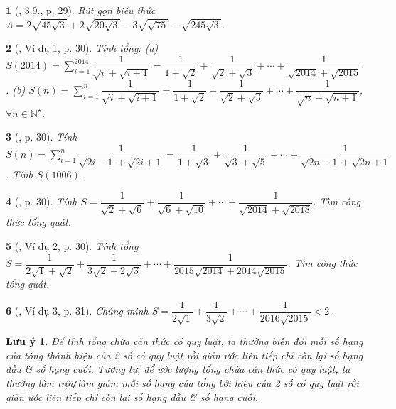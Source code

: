 \documentclass{article}
\newtheorem{baitoan}{}
\newtheorem{luuy}{Lưu ý}
\begin{document}
\begin{baitoan}[\cite{Binh_boi_duong_Toan_9_tap_1}, 3.9., p. 29]
	Rút gọn biểu thức $A = 2\sqrt{45\sqrt{3}} + 2\sqrt{20\sqrt{3}} - 3\sqrt{\sqrt{75}} - \sqrt{245\sqrt{3}}$.
\end{baitoan}

\begin{baitoan}[\cite{Binh_boi_duong_Toan_9_tap_1}, Ví dụ 1, p. 30]
	Tính tổng: (a) $S(2014) = \sum_{i=1}^{2014} \dfrac{1}{\sqrt{i} + \sqrt{i + 1}} = \dfrac{1}{1 + \sqrt{2}} + \dfrac{1}{\sqrt{2} + \sqrt{3}} + \cdots + \dfrac{1}{\sqrt{2014} + \sqrt{2015}}$. (b) $S(n) = \sum_{i=1}^n \dfrac{1}{\sqrt{i} + \sqrt{i + 1}} = \dfrac{1}{1 + \sqrt{2}} + \dfrac{1}{\sqrt{2} + \sqrt{3}} + \cdots + \dfrac{1}{\sqrt{n} + \sqrt{n + 1}}$, $\forall n\in\mathbb{N}^\star$.
\end{baitoan}

\begin{baitoan}[\cite{Binh_boi_duong_Toan_9_tap_1}, p. 30]
	Tính $S(n) = \sum_{i=1}^n \dfrac{1}{\sqrt{2i - 1} + \sqrt{2i + 1}} = \dfrac{1}{1 + \sqrt{3}} + \dfrac{1}{\sqrt{3} + \sqrt{5}} + \cdots + \dfrac{1}{\sqrt{2n - 1} + \sqrt{2n + 1}}$. Tính $S(1006)$.
\end{baitoan}

\begin{baitoan}[\cite{Binh_boi_duong_Toan_9_tap_1}, p. 30]
	Tính $S = \dfrac{1}{\sqrt{2} + \sqrt{6}} + \dfrac{1}{\sqrt{6} + \sqrt{10}} + \cdots + \dfrac{1}{\sqrt{2014} + \sqrt{2018}}$. Tìm công thức tổng quát.
\end{baitoan}

\begin{baitoan}[\cite{Binh_boi_duong_Toan_9_tap_1}, Ví dụ 2, p. 30]
	Tính tổng $S = \dfrac{1}{2\sqrt{1} + \sqrt{2}} + \dfrac{1}{3\sqrt{2} + 2\sqrt{3}} + \cdots + \dfrac{1}{2015\sqrt{2014} + 2014\sqrt{2015}}$. Tìm công thức tổng quát.
\end{baitoan}

\begin{baitoan}[\cite{Binh_boi_duong_Toan_9_tap_1}, Ví dụ 3, p. 31]
	Chứng minh $S = \dfrac{1}{2\sqrt{1}} + \dfrac{1}{3\sqrt{2}} + \cdots + \dfrac{1}{2016\sqrt{2015}} < 2$.
\end{baitoan}

\begin{luuy}
	Để tính tổng chứa căn thức có quy luật, ta thường biến đổi mỗi số hạng của tổng thành hiệu của 2 số có quy luật rồi giản ước liên tiếp chỉ còn lại số hạng đầu \& số hạng cuối. Tương tự, để ước lượng tổng chứa căn thức có quy luật, ta thường làm trội{\tt/}làm giảm mỗi số hạng của tổng bởi hiệu của 2 số có quy luật rồi giản ước liên tiếp chỉ còn lại số hạng đầu \& số hạng cuối.
\end{luuy}
\end{document}
